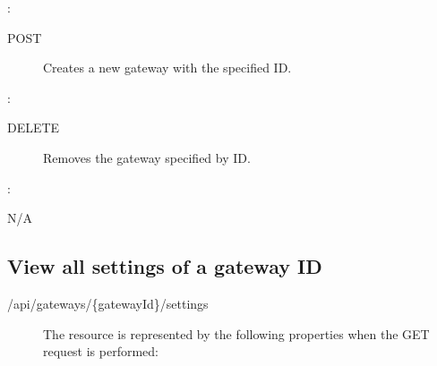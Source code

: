 \documentclass[letterpaper,10pt,english]{sphinxmanual}
\begin{document}
:

\begin{sphinxVerbatim}[commandchars=\\\{\}]
\end{sphinxVerbatim}
\begin{description}
\item[{ POST}] \leavevmode
Creates a new gateway with the specified ID.

\end{description}

:

\begin{sphinxVerbatim}[commandchars=\\\{\}]
\end{sphinxVerbatim}
\begin{description}
\item[{ DELETE}] \leavevmode
Removes the gateway specified by ID.

\end{description}

:

\begin{sphinxVerbatim}[commandchars=\\\{\}]
\end{sphinxVerbatim}

 N/A


\subsection{View all settings of a gateway ID}
\label{\detokenize{restapi:view-all-settings-of-a-gateway-id}}
 /api/gateways/\{gatewayId\}/settings
\begin{description}
\item[{}] \leavevmode
The resource is represented by the following properties when the GET request is performed:

\end{description}
\end{document}
